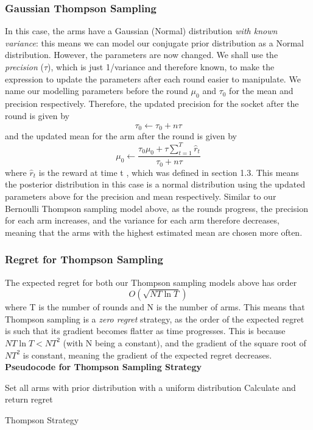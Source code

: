 \subsubsection{Gaussian Thompson Sampling}
In this case, the arms have a Gaussian (Normal) distribution \emph{with known variance}: this means we can model our conjugate prior distribution as a Normal distribution. However, the parameters are now changed. We shall use the \emph{precision} ($\tau$), which is just 1/variance and therefore known, to make the expression to update the parameters after each round easier to manipulate. We name our modelling parameters before the round $\mu_0$ and $\tau_0$ for the mean and precision respectively. Therefore, the updated precision for the socket after the round is given by 
$$\tau_0\xleftarrow{}\tau_0 + n\tau$$
and the updated mean for the arm after the round is given by
$$\mu_0\xleftarrow{}\frac{\tau_0\mu_0 + \tau\sum_{t=1}^T\widehat{r}_t}{\tau_0 + n\tau} $$
where $\widehat{r}_t$ is the reward at time t \citep{agrawal2013further}, which was defined in section 1.3. This means the posterior distribution in this case is a normal distribution using the updated parameters above for the precision and mean respectively. Similar to our Bernoulli Thompson sampling model above, as the rounds progress, the precision for each arm increases, and the variance for each arm therefore decreases, meaning that the arms with the highest estimated mean are chosen more often.

\subsubsection{Regret for Thompson Sampling}
The expected regret for both our Thompson sampling models above has order
$$O(\sqrt{NT\ln{T}})$$
where T is the number of rounds and N is the number of arms. \citep{agrawal2013further} This means that Thompson sampling is a \emph{zero regret} strategy, as the order of the expected regret is such that its gradient becomes flatter as time progresses. This is because $NT\ln{T} < NT^2$ (with N being a constant), and the gradient of the square root of $NT^2$ is constant, meaning the gradient of the expected regret decreases.
\newline
\textbf{Pseudocode for Thompson Sampling Strategy}
\newline
\begin{algorithm}[H]
 Set all arms with prior distribution with a uniform distribution\;
 Calculate and return regret
 \caption{Thompson Strategy}
\end{algorithm}
